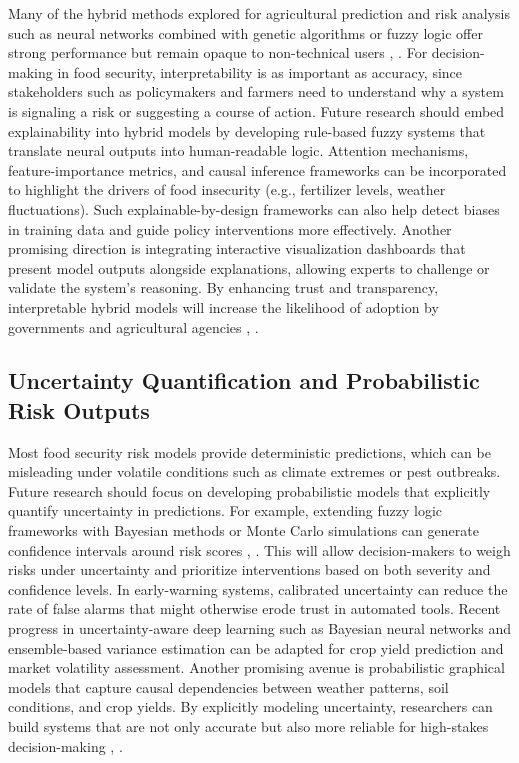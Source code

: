\documentclass[preprint,12pt]{elsarticle}
\begin{document}
	Many of the hybrid methods explored for agricultural prediction and risk
	analysis such as neural networks combined with genetic algorithms or
	fuzzy logic offer strong performance but remain opaque to non-technical
	users \cite{ref65}, \cite{ref66}. For decision-making in food security,
	interpretability is as important as accuracy, since stakeholders such as
	policymakers and farmers need to understand why a system is signaling a
	risk or suggesting a course of action. Future research should embed
	explainability into hybrid models by developing rule-based fuzzy systems
	that translate neural outputs into human-readable logic. Attention
	mechanisms, feature-importance metrics, and causal inference frameworks
	can be incorporated to highlight the drivers of food insecurity (e.g.,
	fertilizer levels, weather fluctuations). Such explainable-by-design
	frameworks can also help detect biases in training data and guide policy
	interventions more effectively. Another promising direction is
	integrating interactive visualization dashboards that present model
	outputs alongside explanations, allowing experts to challenge or
	validate the system's reasoning. By enhancing trust and transparency,
	interpretable hybrid models will increase the likelihood of adoption by
	governments and agricultural agencies \cite{ref65}, \cite{ref66}.
	
	\subsection{Uncertainty Quantification and Probabilistic Risk Outputs}
	
	Most food security risk models provide deterministic predictions, which
	can be misleading under volatile conditions such as climate extremes or
	pest outbreaks. Future research should focus on developing probabilistic
	models that explicitly quantify uncertainty in predictions. For example,
	extending fuzzy logic frameworks with Bayesian methods or Monte Carlo
	simulations can generate confidence intervals around risk scores \cite{ref83},
	\cite{ref68}. This will allow decision-makers to weigh risks under uncertainty
	and prioritize interventions based on both severity and confidence
	levels. In early-warning systems, calibrated uncertainty can reduce the
	rate of false alarms that might otherwise erode trust in automated
	tools. Recent progress in uncertainty-aware deep learning such as
	Bayesian neural networks and ensemble-based variance estimation can be
	adapted for crop yield prediction and market volatility assessment.
	Another promising avenue is probabilistic graphical models that capture
	causal dependencies between weather patterns, soil conditions, and crop
	yields. By explicitly modeling uncertainty, researchers can build
	systems that are not only accurate but also more reliable for
	high-stakes decision-making \cite{ref83}, \cite{ref68}.
	
\end{document}
